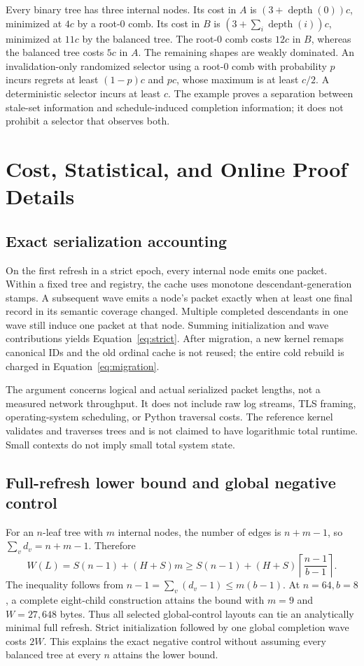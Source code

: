 Every binary tree has three internal nodes. Its cost in $A$ is $(3+\operatorname{depth}(0))c$, minimized at $4c$ by a root-0 comb. Its cost in $B$ is $(3+\sum_i\operatorname{depth}(i))c$, minimized at $11c$ by the balanced tree. The root-0 comb costs $12c$ in $B$, whereas the balanced tree costs $5c$ in $A$. The remaining shapes are weakly dominated. An invalidation-only randomized selector using a root-0 comb with probability $p$ incurs regrets at least $(1-p)c$ and $pc$, whose maximum is at least $c/2$. A deterministic selector incurs at least $c$. The example proves a separation between stale-set information and schedule-induced completion information; it does not prohibit a selector that observes both.

\section{Cost, Statistical, and Online Proof Details}\label{app:online}
\subsection{Exact serialization accounting}
On the first refresh in a strict epoch, every internal node emits one packet. Within a fixed tree and registry, the cache uses monotone descendant-generation stamps. A subsequent wave emits a node's packet exactly when at least one final record in its semantic coverage changed. Multiple completed descendants in one wave still induce one packet at that node. Summing initialization and wave contributions yields Equation~\eqref{eq:strict}. After migration, a new kernel remaps canonical IDs and the old ordinal cache is not reused; the entire cold rebuild is charged in Equation~\eqref{eq:migration}.

The argument concerns logical and actual serialized packet lengths, not a measured network throughput. It does not include raw log streams, TLS framing, operating-system scheduling, or Python traversal costs. The reference kernel validates and traverses trees and is not claimed to have logarithmic total runtime. Small contexts do not imply small total system state.

\subsection{Full-refresh lower bound and global negative control}
For an $n$-leaf tree with $m$ internal nodes, the number of edges is $n+m-1$, so $\sum_vd_v=n+m-1$. Therefore
\begin{equation}
 W(L)=S(n-1)+(H+S)m\ge S(n-1)+(H+S)\left\lceil\frac{n-1}{b-1}\right\rceil.
\end{equation}
The inequality follows from $n-1=\sum_v(d_v-1)\le m(b-1)$. At $n=64,b=8$, a complete eight-child construction attains the bound with $m=9$ and $W=27,648$ bytes. Thus all selected global-control layouts can tie an analytically minimal full refresh. Strict initialization followed by one global completion wave costs $2W$. This explains the exact negative control without assuming every balanced tree at every $n$ attains the lower bound.

